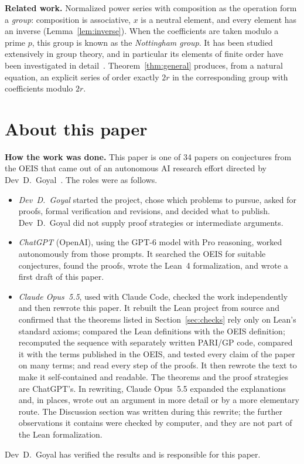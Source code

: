 \documentclass[11pt,a4paper]{article}
\theoremstyle{definition}
\theoremstyle{remark}
\newcommand{\para}[1]{\par\medskip\noindent\textbf{#1}\enspace}
\begin{document}
\para{Related work.} Normalized power series with composition as the operation form a \emph{group}: composition is
associative, $x$ is a neutral element, and every element has an inverse (Lemma~\ref{lem:inverse}). When the
coefficients are taken modulo a prime $p$, this group is known as the \emph{Nottingham group}. It has been studied
extensively in group theory, and in particular its elements of finite order have been investigated in
detail~\cite{camina}. Theorem~\ref{thm:general} produces, from a natural equation, an explicit series of order exactly
$2r$ in the corresponding group with coefficients modulo $2r$.

\section*{About this paper}\label{sec:about}
\para{How the work was done.}
This paper is one of 34 papers on conjectures from the OEIS that came out of an autonomous AI research effort directed
by Dev~D.~Goyal~\cite{repo}. The roles were as follows.
\begin{itemize}
\item \emph{Dev~D.~Goyal} started the project, chose which problems to pursue, asked for proofs, formal verification and
revisions, and decided what to publish. Dev~D.~Goyal did not supply proof strategies or intermediate arguments.
\item \emph{ChatGPT} (OpenAI), using the GPT-6 model with Pro reasoning, worked autonomously from those prompts. It
searched the OEIS for suitable conjectures, found the proofs, wrote the Lean~4 formalization, and wrote a first draft
of this paper.
\item \emph{Claude Opus~5.5}, used with Claude Code, checked the work independently and then rewrote this paper. It
rebuilt the Lean project from source and confirmed that the theorems listed in Section~\ref{sec:checks} rely only on
Lean's standard axioms; compared the Lean definitions with the OEIS definition; recomputed the sequence with separately
written PARI/GP code, compared it with the terms published in the OEIS, and tested every claim of the paper on many
terms; and read every step of the proofs. It then rewrote the text to make it self-contained and readable. The
theorems and the proof strategies are ChatGPT's. In rewriting, Claude Opus~5.5 expanded the explanations and, in
places, wrote out an argument in more detail or by a more elementary route. The Discussion section was written during
this rewrite; the further observations it contains were checked by computer, and they are not part of the Lean
formalization.
\end{itemize}
Dev~D.~Goyal has verified the results and is responsible for this paper.
\end{document}
